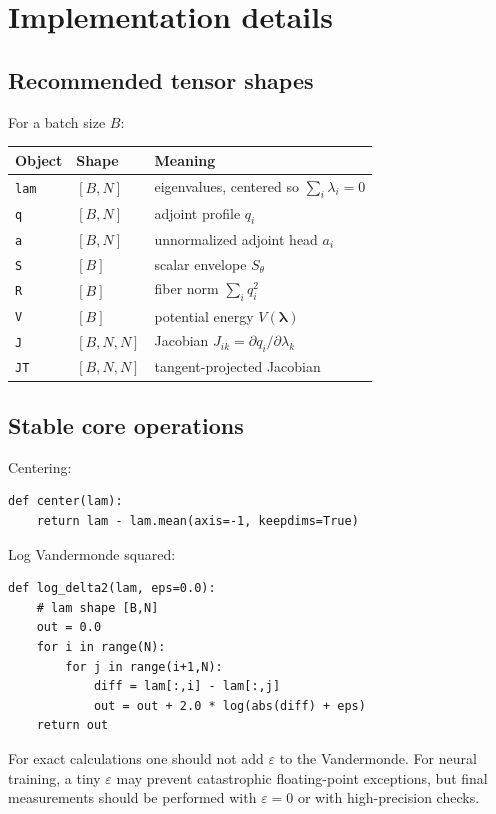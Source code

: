\documentclass[11pt]{article}
\newcommand{\eps}{\varepsilon}
\begin{document}
\section{Implementation details}

\subsection{Recommended tensor shapes}

For a batch size $B$:
\begin{center}
\begin{tabular}{lll}
\toprule
Object & Shape & Meaning \\
\midrule
\texttt{lam} & $[B,N]$ & eigenvalues, centered so $\sum_i\lambda_i=0$ \\
\texttt{q} & $[B,N]$ & adjoint profile $q_i$ \\
\texttt{a} & $[B,N]$ & unnormalized adjoint head $a_i$ \\
\texttt{S} & $[B]$ & scalar envelope $S_\theta$ \\
\texttt{R} & $[B]$ & fiber norm $\sum_iq_i^2$ \\
\texttt{V} & $[B]$ & potential energy $V(\bm\lambda)$ \\
\texttt{J} & $[B,N,N]$ & Jacobian $J_{i k}=\partial q_i/\partial\lambda_k$ \\
\texttt{JT} & $[B,N,N]$ & tangent-projected Jacobian \\
\bottomrule
\end{tabular}
\end{center}

\subsection{Stable core operations}

Centering:
\begin{lstlisting}
def center(lam):
    return lam - lam.mean(axis=-1, keepdims=True)
\end{lstlisting}

Log Vandermonde squared:
\begin{lstlisting}
def log_delta2(lam, eps=0.0):
    # lam shape [B,N]
    out = 0.0
    for i in range(N):
        for j in range(i+1,N):
            diff = lam[:,i] - lam[:,j]
            out = out + 2.0 * log(abs(diff) + eps)
    return out
\end{lstlisting}
For exact calculations one should not add $\eps$ to the Vandermonde.  For neural training, a tiny $\eps$ may prevent catastrophic floating-point exceptions, but final measurements should be performed with $\eps=0$ or with high-precision checks.
\end{document}
